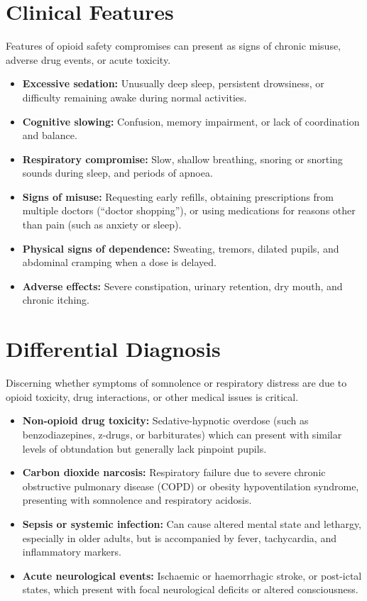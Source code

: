 \section*{Clinical Features}
Features of opioid safety compromises can present as signs of chronic misuse, adverse drug events, or acute toxicity.
\begin{itemize}
    \item \textbf{Excessive sedation:} Unusually deep sleep, persistent drowsiness, or difficulty remaining awake during normal activities.
    \item \textbf{Cognitive slowing:} Confusion, memory impairment, or lack of coordination and balance.
    \item \textbf{Respiratory compromise:} Slow, shallow breathing, snoring or snorting sounds during sleep, and periods of apnoea.
    \item \textbf{Signs of misuse:} Requesting early refills, obtaining prescriptions from multiple doctors (``doctor shopping''), or using medications for reasons other than pain (such as anxiety or sleep).
    \item \textbf{Physical signs of dependence:} Sweating, tremors, dilated pupils, and abdominal cramping when a dose is delayed.
    \item \textbf{Adverse effects:} Severe constipation, urinary retention, dry mouth, and chronic itching.
\end{itemize}

\section*{Differential Diagnosis}
Discerning whether symptoms of somnolence or respiratory distress are due to opioid toxicity, drug interactions, or other medical issues is critical.
\begin{itemize}
    \item \textbf{Non-opioid drug toxicity:} Sedative-hypnotic overdose (such as benzodiazepines, z-drugs, or barbiturates) which can present with similar levels of obtundation but generally lack pinpoint pupils.
    \item \textbf{Carbon dioxide narcosis:} Respiratory failure due to severe chronic obstructive pulmonary disease (COPD) or obesity hypoventilation syndrome, presenting with somnolence and respiratory acidosis.
    \item \textbf{Sepsis or systemic infection:} Can cause altered mental state and lethargy, especially in older adults, but is accompanied by fever, tachycardia, and inflammatory markers.
    \item \textbf{Acute neurological events:} Ischaemic or haemorrhagic stroke, or post-ictal states, which present with focal neurological deficits or altered consciousness.
\end{itemize}

